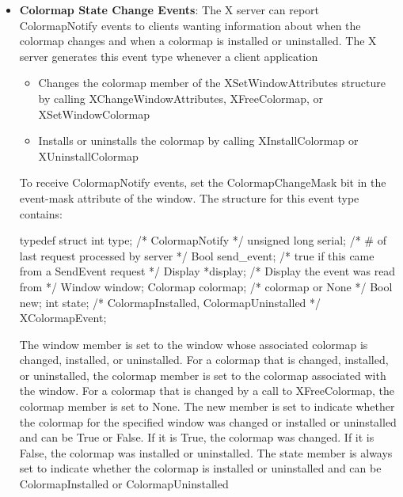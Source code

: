 \documentclass{report}
\begin{document}
\begin{itemize}
\begin{cppcode}
{                    Display *display;           /* Display the event was read from */
                    Window window;
                    int width, height;
                } XResizeRequestEvent;
            \end{cppcode}
            \bigbreak \noindent 
            The window member is set to the window whose size another client attempted to change. The width and height members are set to the inside size of the window, excluding the border.
        \item \textbf{Colormap State Change Events}: The X server can report ColormapNotify events to clients wanting information about when the colormap changes and when a colormap is installed or uninstalled. The X server generates this event type whenever a client application
            \begin{itemize}
                \item Changes the colormap member of the XSetWindowAttributes structure by calling XChangeWindowAttributes, XFreeColormap, or XSetWindowColormap
                \item Installs or uninstalls the colormap by calling XInstallColormap or XUninstallColormap
            \end{itemize}
            To receive ColormapNotify events, set the ColormapChangeMask bit in the event-mask attribute of the window.
            \bigbreak \noindent 
            The structure for this event type contains:
            \bigbreak \noindent 
            \begin{cppcode}
                typedef struct {
                    int type;                   /* ColormapNotify */
                    unsigned long serial;       /* # of last request processed by server */
                    Bool send_event;            /* true if this came from a SendEvent request */
                    Display *display;           /* Display the event was read from */
                    Window window;
                    Colormap colormap;          /* colormap or None */
                    Bool new;
                    int state;                  /* ColormapInstalled, ColormapUninstalled */
                } XColormapEvent;
            \end{cppcode}
            \bigbreak \noindent 
            The window member is set to the window whose associated colormap is changed, installed, or uninstalled. For a colormap that is changed, installed, or uninstalled, the colormap member is set to the colormap associated with the window. For a colormap that is changed by a call to XFreeColormap, the colormap member is set to None. The new member is set to indicate whether the colormap for the specified window was changed or installed or uninstalled and can be True or False. If it is True, the colormap was changed. If it is False, the colormap was installed or uninstalled. The state member is always set to indicate whether the colormap is installed or uninstalled and can be ColormapInstalled or ColormapUninstalled

\end{itemize}
\end{document}
